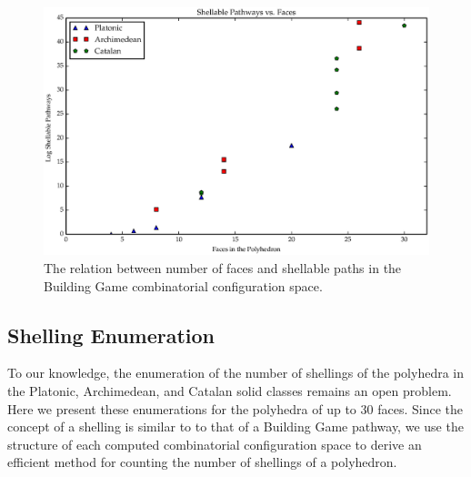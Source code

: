 \begin{figure}[ht]
\includegraphics[scale=0.6, angle=0]{images/polys_face_shell_path.eps}
\caption{The relation between number of faces and shellable paths in the Building Game combinatorial configuration space.}
\label{fig:FacPathShell}
\end{figure}

\subsection{Shelling Enumeration}

To our knowledge, the enumeration of the number of shellings of the polyhedra in the Platonic, Archimedean, and Catalan solid classes remains an open problem. Here we present these enumerations for the polyhedra of up to $30$ faces. Since the concept of a shelling is similar to to that of a Building Game pathway, we use the structure of each computed combinatorial configuration space to derive an efficient method for counting the number of shellings of a polyhedron. 

